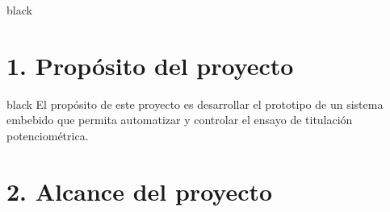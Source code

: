 \documentclass[11pt]{charter}
\begin{document}
\begin{consigna}{black}
 

\end{consigna}

\section{1. Propósito del proyecto}
\label{sec:proposito}

\begin{consigna}{black}
El propósito de este proyecto es desarrollar el prototipo de un sistema embebido que permita automatizar y controlar el ensayo de titulación potenciométrica.
\end{consigna}

\section{2. Alcance del proyecto}
\label{sec:alcance}
\end{document}
